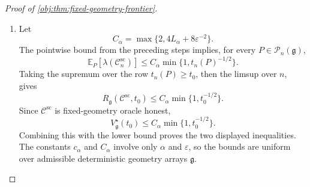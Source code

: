 \documentclass[11pt]{article}
\begin{document}
\begin{proof}[Proof of \cref{obj:thm:fixed-geometry-frontier}]
\begin{enumerate}
\item Let
\[
C_\alpha=\max\{2,4L_\alpha+8\varepsilon^{-2}\}.
\]
The pointwise bound from the preceding steps implies, for every \(P\in\mathcal P_n(\mathfrak g)\),
\[
\mathbb E_P[\lambda(\mathscr C_n^{\mathrm{sc}})]
\le
C_\alpha\min\{1,t_n(P)^{-1/2}\}.
\]
Taking the supremum over the row \(t_n(P)\ge t_0\), then the limsup over \(n\), gives
\[
R_{\mathfrak g}(\mathscr C^{\mathrm{sc}},t_0)
\le
C_\alpha\min\{1,t_0^{-1/2}\}.
\]
Since \(\mathscr C^{\mathrm{sc}}\) is fixed-geometry oracle honest,
\[
V_{\mathfrak g}^{\star}(t_0)
\le
C_\alpha\min\{1,t_0^{-1/2}\}.
\]
Combining this with the lower bound proves the two displayed inequalities.  The constants \(c_\alpha\) and \(C_\alpha\) involve only \(\alpha\) and \(\varepsilon\), so the bounds are uniform over admissible deterministic geometry arrays \(\mathfrak g\).
\end{enumerate}
\end{proof}
\end{document}
